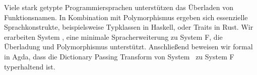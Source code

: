 Viele stark getypte Programmiersprachen unterstützen das Überladen von Funktionsnamen. In Kombination mit Polymorphismus ergeben sich essenzielle Sprachkonstrukte, beispielsweise Typklassen in Haskell, oder Traits in Rust. Wir erarbeiten System \Fo, eine minimale Spracherweiterung zu System F, die Überladung und Polymorphismus unterstützt. Anschließend beweisen wir formal in Agda, dass die Dictionary Passing Transform von System \Fo\ zu System F typerhaltend ist. 